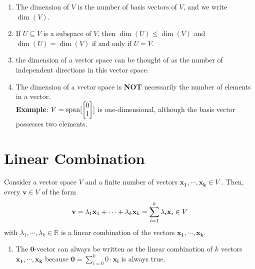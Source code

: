 \begin{enumerate}[itemsep=0.2cm]
    \item The dimension of $V$ is the number of basis vectors of $V$, and we write $\dim(V)$.

    \item If $U \subseteq V$ is a subspace of $V$, then $\dim(U) \leq \dim(V)$ and $\dim(U) = \dim(V)$ if and only if $U = V$.

    \item the dimension of a vector space can be thought of as the number of independent directions in this vector space.

    \item The dimension of a vector space is \textbf{NOT} necessarily the number of elements in a vector.\\
    \textbf{Example}: $V = \operatorname{span}[\begin{bmatrix}0\\1\end{bmatrix}]$ is one-dimensional, although the basis vector possesses two elements.
    
\end{enumerate}









\section{Linear Combination \cite{mfml-1}}\label{Linear Combination}
Consider a vector space $V$ and a finite number of vectors $\mathbf{x_1, \cdots , x_k} \in V$ . Then, every $\mathbf{v} \in V$ of the form
\[
    \hfill
    \displaystyle
    \mathbf{v} = \lambda_1 \mathbf{x}_1 + \cdots + \lambda_k \mathbf{x}_k = \sum_{i=1}^{k} \lambda_i \mathbf{x}_i \in V
    \hfill
\] 
with $\lambda_1, \cdots, \lambda_k \in \mathbb{R}$ is a linear combination of the vectors $\mathbf{x_1, \cdots, x_k}$.

\begin{enumerate}
    \item The $\mathbf{0}$-vector can always be written as the linear combination of $k$ vectors $\mathbf{x_1, \cdots, x_k}$ because $\displaystyle\mathbf{0} = \sum_{i=0}^{k} 0\cdot\mathbf{x_i}$ is always true.
\end{enumerate}






